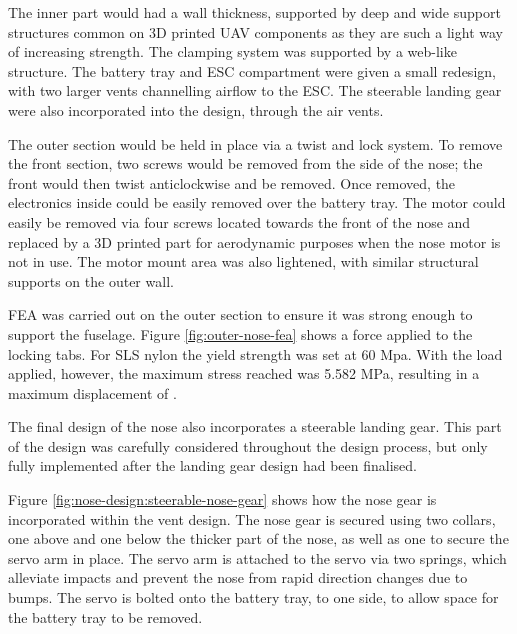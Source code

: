 \documentclass[../../main.tex]{subfiles}
\begin{document}

The inner part would had a  wall thickness, supported by  deep and  wide support structures common on 3D printed UAV components as they are such a light way of increasing strength.
The clamping system was supported by a web-like structure.
The battery tray and ESC compartment were given a small redesign, with two larger vents channelling airflow to the ESC.
The steerable landing gear were also incorporated into the design, through the air vents. 


The outer section would be held in place via a twist and lock system.
To remove the front section, two screws would be removed from the side of the nose; the front would then twist anticlockwise and be removed.
Once removed, the electronics inside could be easily removed over the battery tray.
The motor could easily be removed via four screws located towards the front of the nose and replaced by a 3D printed part for aerodynamic purposes when the nose motor is not in use.
The motor mount area was also lightened, with similar structural supports on the  outer wall. 


FEA was carried out on the outer section to ensure it was strong enough to support the fuselage.
Figure \ref{fig:outer-nose-fea} shows a  force applied to the locking tabs.
For SLS nylon the yield strength was set at 60 Mpa.
With the  load applied, however, the maximum stress reached was 5.582 MPa, resulting in a maximum displacement of . 


The final design of the nose also incorporates a steerable landing gear.
This part of the design was carefully considered throughout the design process, but only fully implemented after the landing gear design had been finalised. 


Figure \ref{fig:nose-design:steerable-nose-gear} shows how the nose gear is incorporated within the vent design.
The nose gear is secured using two collars, one above and one below the thicker part of the nose, as well as one to secure the servo arm in place.
The servo arm is attached to the servo via two springs, which alleviate impacts and prevent the nose from rapid direction changes due to bumps.
The servo is bolted onto the battery tray, to one side, to allow space for the battery tray to be removed. 
\end{document}
